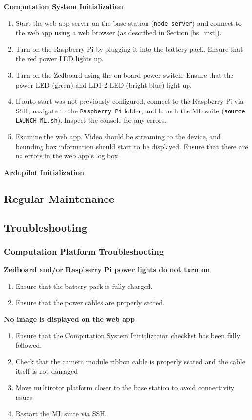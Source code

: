 \documentclass[10pt,letterpaper]{article}
\begin{document}
\textbf{Computation System Initialization}
\begin{enumerate}
\item Start the web app server on the base station (\texttt{node server}) and connect to the web app using a web browser (as described in Section \ref{bs_inst}).
\item Turn on the Raspberry Pi by plugging it into the battery pack. Ensure that the red power LED lights up.
\item Turn on the Zedboard using the on-board power switch. Ensure that the power LED (green) and LD1-2 LED (bright blue) light up.
\item If auto-start was not previously configured, connect to the Raspberry Pi via SSH, navigate to the \texttt{Raspberry Pi} folder, and launch the ML suite (\texttt{source LAUNCH\_ML.sh}). Inspect the console for any errors.
\item Examine the web app. Video should be streaming to the device, and bounding box information should start to be displayed. Ensure that there are no errors in the web app's log box.
\end{enumerate}

\textbf{Ardupilot Initialization}

\subsection{Regular Maintenance}
\subsection{Troubleshooting}
\subsubsection{Computation Platform Troubleshooting}
\textbf{Zedboard and/or Raspberry Pi power lights do not turn on}
\begin{enumerate}
\item Ensure that the battery pack is fully charged.
\item Ensure that the power cables are properly seated.
\end{enumerate}

\textbf{No image is displayed on the web app}
\begin{enumerate}
\item Ensure that the Computation System Initialization checklist has been fully followed.
\item Check that the camera module ribbon cable is properly seated and the cable itself is not damaged
\item Move multirotor platform closer to the base station to avoid connectivity issues
\item Restart the ML suite via SSH.
\end{enumerate}
\end{document}
